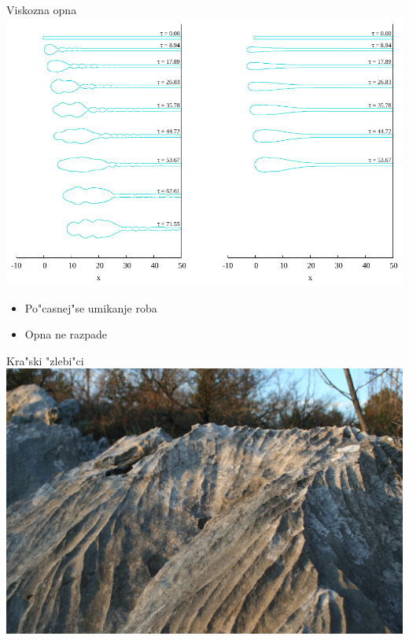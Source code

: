 \documentclass{beamer}
\begin{document}
\begin{frame}{Viskozna opna}
 \includegraphics[width=.7\textwidth]{./Slike/scat-rezultat-1}
 \begin{itemize}
  \item Po"casnej"se umikanje roba
  \item Opna ne razpade
 \end{itemize}
\end{frame}
 
\begin{frame}{Kra"ski "zlebi"ci}
\includegraphics[width=\textwidth]{./Slike/Zlebici}

\end{frame}
\end{document}
